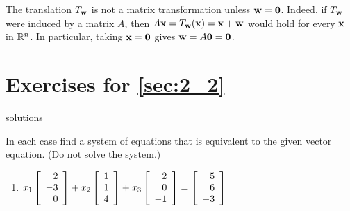 The translation $T_{\textbf{w}}$ is not a matrix transformation unless $\textbf{w} = \textbf{0}$. Indeed, if $T_{\textbf{w}}$ were induced by a matrix $A$, then $A\textbf{x} = T_{\textbf{w}}(\textbf{x}) = \textbf{x} + \textbf{w}$ would hold for every $\textbf{x}$ in $\mathbb{R}^n$. In particular, taking $\textbf{x} = \textbf{0}$ gives $\textbf{w} = A\textbf{0} = \textbf{0}$.


\section*{Exercises for \ref{sec:2_2}}

\begin{Filesave}{solutions}
\end{Filesave}

\begin{multicols}{2}
\begin{ex}
In each case find a system of equations that is equivalent to the given vector equation. (Do not solve the system.)


\begin{enumerate}[leftmargin=1em,label={\alph*.}]
\item {\footnotesize $x_{1} \left[ \begin{array}{r}
2 \\
-3 \\
0
\end{array} \right] + x_{2} \left[ \begin{array}{r}
1 \\
1 \\
4
\end{array} \right] + x_{3} \left[ \begin{array}{r}
2 \\
0 \\
-1
\end{array} \right] = \left[ \begin{array}{r}
5 \\
6 \\
-3
\end{array} \right]$}


\end{enumerate}
\end{ex}
\end{multicols}
